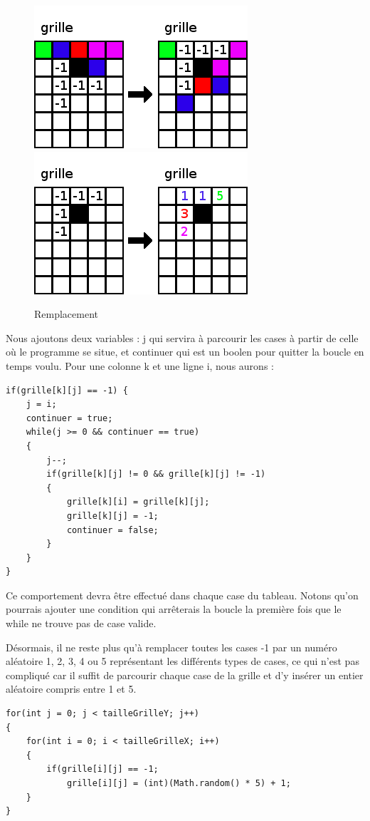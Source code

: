 \begin{figure}[h]
	\center
	\caption{\label{Remplacement} Remplacement}
	\includegraphics{imgs/Remplacement1}
	\includegraphics{imgs/Remplacement2}
\end{figure}
	
	Nous ajoutons deux variables : j qui servira à parcourir les cases à partir de celle où le programme se situe, et continuer qui est un boolen pour quitter la boucle en temps voulu.
	Pour une colonne k et une ligne i, nous aurons :
\begin{lstlisting}
if(grille[k][j] == -1) {
	j = i;
	continuer = true;
	while(j >= 0 && continuer == true)
	{
		j--;
		if(grille[k][j] != 0 && grille[k][j] != -1)
		{
			grille[k][i] = grille[k][j];
			grille[k][j] = -1;
			continuer = false;
		}
	}
}
\end{lstlisting}

	Ce comportement devra être effectué dans chaque case du tableau. Notons qu'on pourrais ajouter une condition qui arrêterais la boucle la première fois que le while ne trouve pas de case valide.
	
	Désormais, il ne reste plus qu'à remplacer toutes les cases -1 par un numéro aléatoire 1, 2, 3, 4 ou 5 représentant les différents types de cases, ce qui n'est pas compliqué car 
il suffit de parcourir chaque case de la grille et d'y insérer un entier aléatoire compris entre 1 et 5.

\begin{lstlisting}
for(int j = 0; j < tailleGrilleY; j++)
{
	for(int i = 0; i < tailleGrilleX; i++)
	{
		if(grille[i][j] == -1;
			grille[i][j] = (int)(Math.random() * 5) + 1;
	}
}
\end{lstlisting}

